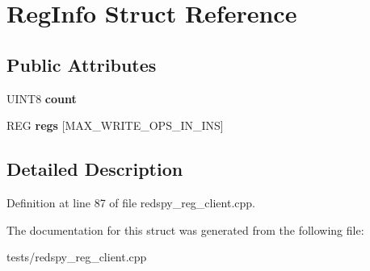 \hypertarget{structRegInfo}{\section{Reg\-Info Struct Reference}
\label{structRegInfo}
}
\subsection*{Public Attributes}
\begin{DoxyCompactItemize}
\item 
\hypertarget{structRegInfo_a902edd5f2bbbf418e56ef95b6f9ed652}{U\-I\-N\-T8 {\bfseries count}}\label{structRegInfo_a902edd5f2bbbf418e56ef95b6f9ed652}

\item 
\hypertarget{structRegInfo_aa3b5ef76a7b9879d4e3094bdd5f8237a}{R\-E\-G {\bfseries regs} \mbox{[}M\-A\-X\-\_\-\-W\-R\-I\-T\-E\-\_\-\-O\-P\-S\-\_\-\-I\-N\-\_\-\-I\-N\-S\mbox{]}}\label{structRegInfo_aa3b5ef76a7b9879d4e3094bdd5f8237a}

\end{DoxyCompactItemize}


\subsection{Detailed Description}


Definition at line 87 of file redspy\-\_\-reg\-\_\-client.\-cpp.



The documentation for this struct was generated from the following file\-:\begin{DoxyCompactItemize}
\item 
tests/redspy\-\_\-reg\-\_\-client.\-cpp\end{DoxyCompactItemize}
